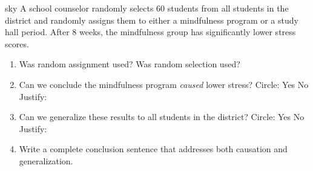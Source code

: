 \documentclass[10pt]{article}
\begin{document}
\namedateperiod

\vspace{0.14in}

\begin{scenariobox}[Context]{sky}
\small
A school counselor randomly selects 60 students from all students in the district and
randomly assigns them to either a mindfulness program or a study hall period. After
8 weeks, the mindfulness group has significantly lower stress scores.
\end{scenariobox}

\vspace{0.1in}

\begin{practicebox}
\small
\begin{enumerate}[leftmargin=1.5em, itemsep=10pt]
  \item Was random assignment used? \blank{3cm}
        Was random selection used? \blank{3cm}

  \item Can we conclude the mindfulness program \emph{caused} lower stress?
        Circle: \quad Yes \quad No \\[4pt]
        Justify: \writeline

  \item Can we generalize these results to all students in the district?
        Circle: \quad Yes \quad No \\[4pt]
        Justify: \writeline

  \item Write a complete conclusion sentence that addresses both causation and
        generalization.\\
        \writeline\\[1pt]\writeline\\[1pt]\writeline
\end{enumerate}
\end{practicebox}
\end{document}
